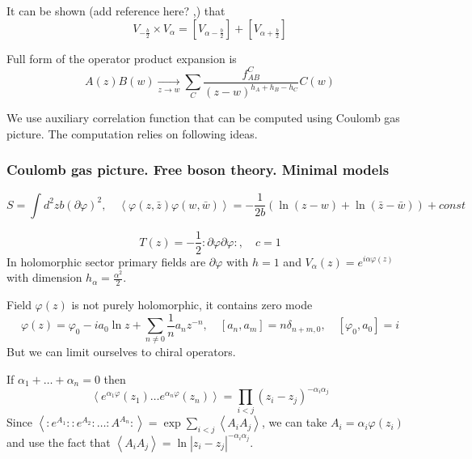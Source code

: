 \documentclass[12pt]{article}
\begin{document}
It can be shown (add reference here? \cite{nakayama2004liouville},\cite{teschner2001liouville}) that 
\begin{equation}
  \label{eq:34}
  V_{-\frac{b}{2}}\times V_{\alpha}= [V_{\alpha-\frac{b}{2}}]+[V_{\alpha+\frac{b}{2}}]
\end{equation}


Full form of the operator product expansion is
\begin{equation}
  \label{eq:39}
  A(z)B(w)\underset{z\to w}{\longrightarrow} \sum_{C} \frac{f_{AB}^{C}}{(z-w)^{h_{A}+h_{B}-h_{C}}} C(w)
\end{equation}

We use auxiliary correlation function that can be computed using Coulomb gas picture. The
computation relies on following ideas.


\subsubsection{Coulomb gas picture. Free boson theory. Minimal models}
\label{sec:free-boson-minimal-models}


\begin{equation}
  \label{eq:40}
  S=\int d^{2}z b (\partial \varphi)^{2},\quad \left<\varphi(z,\bar z)\varphi(w,\bar
    w)\right>=-\frac{1}{2b}\left(\ln (z-w) + \ln (\bar z - \bar w)\right)+const
\end{equation}

\begin{equation}
  \label{eq:42}
  T(z)=-\frac{1}{2}:\partial \varphi \partial \varphi:, \quad c=1
\end{equation}
In holomorphic sector primary fields are $\partial \varphi$ with $h=1$ and
$V_{\alpha}(z)=e^{i \alpha \varphi(z)}$ with dimension $h_{\alpha}=\frac{\alpha^{2}}{2}$.

Field $\varphi(z)$ is not purely holomorphic, it contains zero mode
\begin{equation}
  \label{eq:43}
  \varphi(z)=\varphi_{0}-ia_{0}\ln z+\sum_{n\neq 0}\frac{1}{n}a_{n} z^{-n},\quad
  [a_{n},a_{m}]=n\delta_{n+m,0}, \quad [\varphi_{0},a_{0}]=i
\end{equation}
But we can limit ourselves to chiral operators.

If $\alpha_{1}+\dots+\alpha_{n}=0$ then 
\begin{equation}
  \label{eq:41}
  \left<e^{\alpha_{1}\varphi}(z_{1})\dots e^{\alpha_{n}\varphi}(z_{n})\right> = \prod_{i<j}(z_{i}-z_{j})^{-\alpha_{i}\alpha_{j}}
\end{equation}
Since $\left< :e^{A_{1}}::e^{A_{2}}:\dots :A^{A_{n}}:\right> =
\exp\sum_{i<j}\left<A_{i}A_{j}\right>$, we can take $A_{i}=\alpha_{i}\varphi(z_{i})$ and use the
fact that $\left<A_{i}A_{j}\right>=\ln |z_{i}-z_{j}|^{-\alpha_{i}\alpha_{j}}$. 
\end{document}
